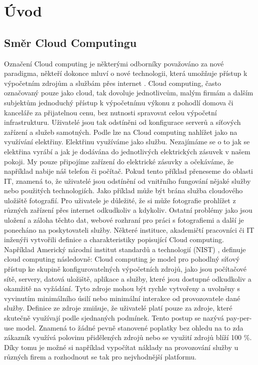 \chapter{Úvod}
\setcounter{page}{1}
\section{Směr Cloud Computingu}
Označení Cloud computing je některými odborníky považováno za nové paradigma, někteří dokonce mluví o nové technologii, která umožňuje přístup k výpočetním zdrojům a službám přes internet \cite{bohm2010cloud}. Cloud computing, často označovaný pouze jako cloud, tak dovoluje jednotlivcům, malým firmám a dalším subjektům jednoduchý přístup k výpočetnímu výkonu z pohodlí domova či kanceláře za přijatelnou cenu, bez nutnosti spravovat celou výpočetní infrastrukturu. Uživatelé jsou tak odstíněni od konfigurace serverů a síťových zařízení a služeb samotných. \newline
Podle \cite{cc2011principles} lze na Cloud computing nahlížet jako na využívání elektřiny. Elektřinu využíváme jako službu. Nezajímáme se o to jak se elektřina vyrábí a jak je dodávána do jednotlivých elektrických zásuvek v našem pokoji. My pouze připojíme zařízení do elektrické zásuvky a očekáváme, že například nabije náš telefon či počítač. Pokud tento příklad přeneseme do oblasti IT, znamená to, že uživatelé jsou odstínění od vnitřního fungování nějaké služby nebo použitých technologiích. Jako příklad může být brána služba cloudového uložiště fotografií. Pro uživatele je důležité, že si může fotografie prohlížet  z různých zařízení přes internet odkudkoliv a kdykoliv. Ostatní problémy jako jsou uložení a záloha těchto dat, webové rozhraní pro práci s fotografiemi a další je ponecháno na poskytovateli služby. \newline
Některé instituce, akademičtí pracovníci či IT inženýři vytvořili definice a charakteristiky  popisující Cloud computing. Například Americký národní institut standardů a technologií (NIST) \cite{mel2011nist}, definuje cloud computing následovně:
Cloud computing je model pro pohodlný síťový přístup ke skupině konfigurovatelných výpočetních zdrojů, jako jsou počítačové sítě, servery, datová uložiště, aplikace a služby, které jsou dostupné odkudkoliv a okamžitě na vyžádání. Tyto zdroje mohou být rychle vytvořeny a uvolněny  s vyvinutím minimálního úsilí nebo minimální interakce od provozovatele dané služby. \newline 
Definice ze zdroje \cite{Vaquero-cloud-definition} zmiňuje, že uživatelé platí pouze za zdroje, které skutečně využívají podle sjednaných podmínek. Tento postup se nazývá pay-per-use model. Znamená to žádné pevně stanovené poplatky bez ohledu na to zda zákazník využívá polovinu přidělených zdrojů nebo se využití zdrojů blíží 100 \%. Díky tomu je možné si například vypočítat náklady na provozování služby u různých firem a rozhodnout se tak pro nejvhodnější platformu. \newline
